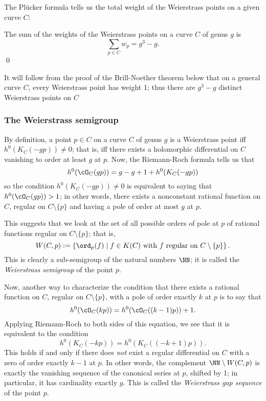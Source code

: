 The Pl\"ucker formula tells us  the total weight of the Weierstrass points on a given curve $C$:

\begin{corollary}\label{plucker formula}
The sum of the weights of the Weierstrass points on a curve $C$ of genus $g$ is
$$
\sum_{p \in C} w_p = g^3-g.
$$\qed
\end{corollary}

It will follow from the proof of the Brill-Noether theorem below that on a general curve $C$, every Weierstrass point has weight 1; thus there are $g^3-g$ distinct Weierstrass points on $C$


\subsubsection{The Weierstrass semigroup} 

By definition, a point $p \in C$ on a curve $C$ of genus $g$ is a Weierstrass point iff $h^0(K_C(-gp)) \neq 0$; that is, iff there exists a holomorphic differential on $C$ vanishing to order at least $g$ at $p$. Now, the Riemann-Roch formula tells us that
$$
h^0(\cO_C(gp)) = g - g + 1 + h^0(K_C(-gp))
$$
so the condition $h^0(K_C(-gp)) \neq 0$ is equivalent to saying that $h^0(\cO_C(gp)) > 1$; in other words, there exists a nonconstant rational function on $C$, regular on $C \setminus \{p\}$ and having a pole of order at most $g$ at $p$.

This suggests that we look at the set of all possible orders of pole at $p$ of rational functions regular on $C \setminus \{p\}$; that is,
$$
W(C,p) := \left\{ \ord_p(f) \mid f \in K(C) \text{ with $f$ regular on } C \setminus \{p\} \right\}.
$$
This is clearly a sub-semigroup of the natural numbers $\NN$; it is called the \emph{Weierstrass semigroup} of the point $p$.  

Now, another way to characterize the condition that there exists a rational function on $C$, regular on $C \setminus \{p\}$, with a pole of order exactly $k$ at $p$ is to say that
$$
h^0(\cO_C(kp)) = h^0(\cO_C((k-1)p)) + 1.
$$
Applying Riemann-Roch to both sides of this equation, we see that it is equivalent to the condition
$$
h^0(K_C(-kp)) = h^0(K_C((-k+1)p)).
$$
This holds  if and only if there does \emph{not} exist a regular differential on $C$ with a zero of order exactly $k-1$ at $p$. In other words, the complement $\NN \setminus W(C,p)$ is exactly the vanishing sequence of the canonical series at $p$, shifted by 1; in particular, it has cardinality  exactly $g$. This is called the \emph{Weierstrass gap sequence} of the point $p$.

